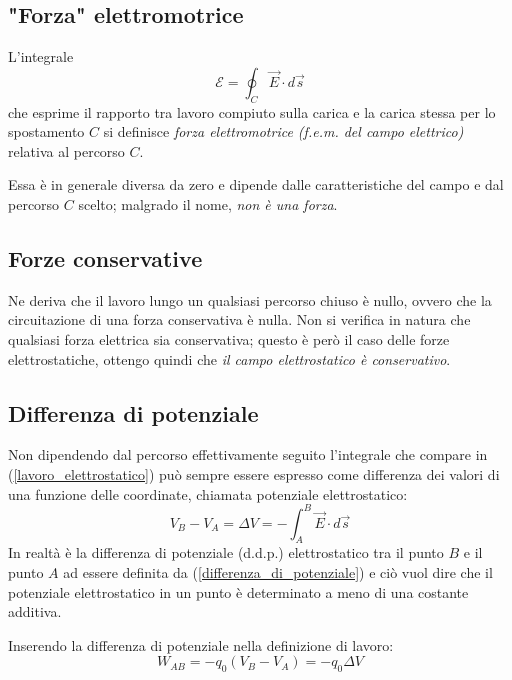 \documentclass[class=book, crop=false, oneside, 12pt]{standalone}
\begin{document}
\subsection{"Forza" elettromotrice}

L'integrale 
\begin{equation}
    \mathcal{E} = \oint_C \overrightarrow{E} \cdot d \overrightarrow{s}
\end{equation}
che esprime il rapporto tra lavoro compiuto sulla carica e la carica stessa per lo spostamento \(C\) si definisce \emph{forza elettromotrice (f.e.m. del campo elettrico)} relativa al percorso \(C\).

Essa è in generale diversa da zero e dipende dalle caratteristiche del campo e dal percorso \(C\) scelto; malgrado il nome, \emph{non è una forza}.

\subsection{Forze conservative}
Ne deriva che il lavoro lungo un qualsiasi percorso chiuso è nullo, ovvero che la circuitazione di una forza conservativa è nulla.
Non si verifica in natura che qualsiasi forza elettrica sia conservativa; questo è però il caso delle forze elettrostatiche, ottengo quindi che \emph{il campo elettrostatico è conservativo}.

\subsection*{Differenza di potenziale}

Non dipendendo dal percorso effettivamente seguito l'integrale che compare in (\ref{lavoro_elettrostatico}) può sempre essere espresso come differenza dei valori di una funzione delle coordinate, chiamata potenziale elettrostatico: 
\begin{equation} \label{differenza_di_potenziale}
    V_B - V_A = \Delta V = - \int_A^B \overrightarrow{E} \cdot d \overrightarrow{s}
\end{equation}
In realtà è la differenza di potenziale (d.d.p.) elettrostatico tra il punto \(B\) e il punto \(A\) ad essere definita da (\ref{differenza_di_potenziale}) e ciò vuol dire che il potenziale elettrostatico in un punto è determinato a meno di una costante additiva.

Inserendo la differenza di potenziale nella definizione di lavoro:
\begin{equation}
    W_{AB} = -q_0 \left(V_B - V_A\right) = -q_0 \Delta V
\end{equation}
\end{document}
